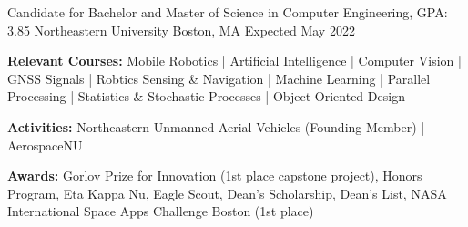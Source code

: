 
\begin{cventries}
  \cventry
    {Candidate for Bachelor and Master of Science in Computer Engineering, GPA: 3.85} %
    {Northeastern University} %
    {Boston, MA} %
    {Expected May 2022} %
    {
      \begin{cvitems} %
         \item {\textbf{Relevant Courses:} Mobile Robotics | Artificial Intelligence | Computer Vision 
         | GNSS Signals | Robtics Sensing \& Navigation | Machine Learning | Parallel Processing | 
         Statistics \& Stochastic Processes | Object Oriented Design}
         \item {\textbf{Activities:} Northeastern Unmanned Aerial Vehicles (Founding Member) | AerospaceNU}
         \item {\textbf{Awards:} Gorlov Prize for Innovation (1st place capstone project), Honors Program, Eta Kappa Nu, Eagle Scout, Dean's Scholarship, 
         Dean's List, NASA International Space Apps Challenge Boston (1st place)}
      \end{cvitems}
    }
\end{cventries}
